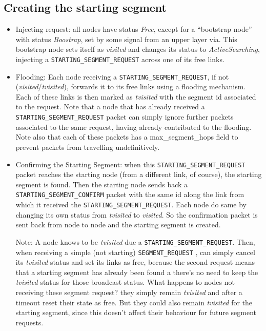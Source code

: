 \subsection{Creating the starting segment}

\begin{itemize}

\item{Injecting request}: all nodes have status \emph{Free}, except for a
“bootstrap node” with status \emph{Boostrap}, set by some signal from an
upper layer via. This bootstrap node sets itself as \emph{visited} and
changes its status to \emph{ActiveSearching}, injecting a
\texttt{STARTING\_SEGMENT\_REQUEST} across one of its free links. 

\item{Flooding}: Each node receiving a \texttt{STARTING\_SEGMENT\_REQUEST},
if not (\emph{visited}/\emph{tvisited}),  forwards it to its free links using a flooding mechanism.
Each of these links is then marked as \emph{tvisited} with the segment id
associated to the request. Note that a node that has already received a
\texttt{STARTING\_SEGMENT\_REQUEST} packet can simply ignore further packets
associated to the same request, having already contributed to the
flooding. Note also that each of these packets has a max\_segment\_hops
field to prevent packets from travelling undefinitively.  

\item{Confirming the Starting Segment}: when this \texttt{STARTING\_SEGMENT\_REQUEST} packet reaches
the starting node (from a different link, of course), the starting
segment is found. Then the starting node sends back a \texttt{STARTING\_SEGMENT\_CONFIRM}
packet with the same id along the link from which it received the
\texttt{STARTING\_SEGMENT\_REQUEST}. Each node do same by changing its own status
from \emph{tvisited} to \emph{visited}. So the confirmation packet is sent back from
node to node and the starting segment is created. 

Note: A node knows to be \emph{tvisited} due a
\texttt{STARTING\_SEGMENT\_REQUEST}.  Then, when receiving a simple
(not starting) \texttt{SEGMENT\_REQUEST} , can simply cancel its
\emph{tvisited} status and set its links as free, because the second
request means that a starting segment has already been found a
there’s no need to keep the \emph{tvisited} status for those broadcast
status. What happens to nodes not receiving these segment request?
they simply remain \emph{tvisited} and after a timeout reset their
state as free. But they could also remain \emph{tvisited} for the
starting segment, since this doesn’t affect their behaviour for future
segment requests.  

\end{itemize}

